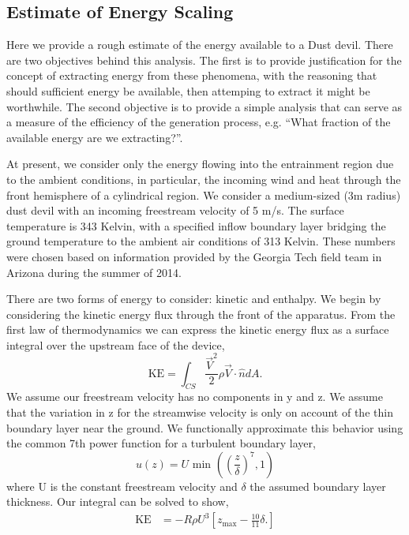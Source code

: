 \subsection{Estimate of Energy Scaling}

Here we provide a rough estimate of the energy
available to a Dust devil. There are two objectives behind this
analysis. The first is to provide justification for the concept of
extracting energy from these phenomena, with the reasoning that should
sufficient energy be available, then attemping to extract it might be
worthwhile. The second objective is to provide a simple analysis that
can serve as a measure of the efficiency of the generation process,
e.g. ``What fraction of the available energy are we extracting?''.  

At present, we consider only the energy flowing into the entrainment
region due to the ambient conditions, in particular, the incoming wind
and heat through the front hemisphere of a cylindrical region. We
consider a medium-sized (3m radius) dust devil with an incoming
freestream velocity of 5 m/s. The surface temperature is 343 Kelvin,
with a specified inflow boundary layer bridging the ground temperature
to the ambient air conditions of 313 Kelvin. 
These numbers were chosen
based on information provided by the Georgia Tech field team in Arizona
during the summer of 2014.  

There are two forms of energy to consider: kinetic and enthalpy. We
begin by considering the kinetic energy flux through the front of the
apparatus. From the first law of thermodynamics we can express the
kinetic energy flux as a surface integral over the upstream face of the device, 
\begin{equation*}
\text{KE} = \int_{CS} \frac{\vec V^2}{2} \rho \vec V \cdot \hat n dA.
\end{equation*}
%
%
We assume our freestream velocity has no components in y and z.
We assume that the variation in z for the streamwise velocity is only on
account of the thin boundary layer near the ground. We functionally
approximate this behavior using the common 7th power function for a
turbulent boundary layer,  
\begin{equation*}
  u(z) = U \text{ min }\left(\left(\frac{z}{\delta}\right)^7,1\right)
\end{equation*}
where U is the constant freestream velocity and $\delta$ the assumed
boundary layer thickness. Our integral can be solved to show, 
\begin{align*}
\text{KE} & = -R \rho U^3 \left[ z_{\text{max}} - \frac{10}{11}\delta.
\right]
\end{align*}

